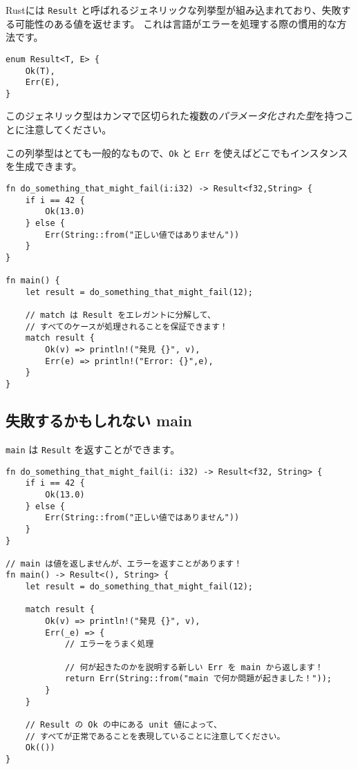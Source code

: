 Rustには \texttt{Result}
と呼ばれるジェネリックな列挙型が組み込まれており、失敗する可能性のある値を返せます。
これは言語がエラーを処理する際の慣用的な方法です。

\begin{verbatim}
enum Result<T, E> {
    Ok(T),
    Err(E),
}
\end{verbatim}

このジェネリック型はカンマで区切られた複数の\emph{パラメータ化された型}を持つことに注意してください。

この列挙型はとても一般的なもので、\texttt{Ok} と \texttt{Err}
を使えばどこでもインスタンスを生成できます。

\begin{verbatim}
fn do_something_that_might_fail(i:i32) -> Result<f32,String> {
    if i == 42 {
        Ok(13.0)
    } else {
        Err(String::from("正しい値ではありません"))
    }
}

fn main() {
    let result = do_something_that_might_fail(12);

    // match は Result をエレガントに分解して、
    // すべてのケースが処理されることを保証できます！
    match result {
        Ok(v) => println!("発見 {}", v),
        Err(e) => println!("Error: {}",e),
    }
}
\end{verbatim}

\subsection{失敗するかもしれない main}

\texttt{main} は \texttt{Result} を返すことができます。

\begin{verbatim}
fn do_something_that_might_fail(i: i32) -> Result<f32, String> {
    if i == 42 {
        Ok(13.0)
    } else {
        Err(String::from("正しい値ではありません"))
    }
}

// main は値を返しませんが、エラーを返すことがあります！
fn main() -> Result<(), String> {
    let result = do_something_that_might_fail(12);

    match result {
        Ok(v) => println!("発見 {}", v),
        Err(_e) => {
            // エラーをうまく処理

            // 何が起きたのかを説明する新しい Err を main から返します！
            return Err(String::from("main で何か問題が起きました！"));
        }
    }

    // Result の Ok の中にある unit 値によって、
    // すべてが正常であることを表現していることに注意してください。
    Ok(())
}
\end{verbatim}

